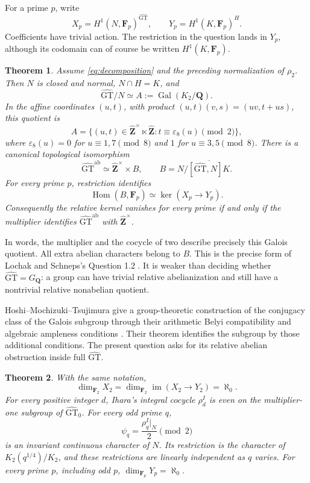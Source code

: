 \documentclass[11pt,a4paper]{article}
\newtheorem{theorem}{Theorem}[section]
\theoremstyle{definition}
\theoremstyle{remark}
\newcommand{\GT}{\widehat{\mathrm{GT}}}
\newcommand{\GTz}{\widehat{\mathrm{GT}}_0}
\newcommand{\Zh}{\widehat{\mathbf Z}}
\newcommand{\Q}{\mathbf Q}
\newcommand{\F}{\mathbf F}
\newcommand{\GQ}{G_{\Q}}
\newcommand{\ab}{\mathrm{ab}}
\DeclareMathOperator{\Hom}{Hom}
\DeclareMathOperator{\Gal}{Gal}
\begin{document}
For a prime $p$, write
\[
 X_p=H^1(N,\F_p)^{\GT},\qquad
 Y_p=H^1(K,\F_p)^H.
\]
Coefficients have trivial action. The restriction in the question lands in $Y_p$, although its codomain can of course be written $H^1(K,\F_p)$.

\begin{theorem}\label{thm:main-structural}
Assume \eqref{eq:decomposition} and the preceding normalization of $\rho_2$. Then $N$ is closed and normal, $N\cap H=K$, and
\[
 \GT/N\simeq A:=\Gal(K_2/\Q).
\]
In the affine coordinates $(u,t)$, with product
$(u,t)(v,s)=(uv,t+us)$, this quotient is
\[
 A=\{(u,t)\in\Zh^\times\ltimes\Zh:
 t\equiv\varepsilon_8(u)\pmod2\},
\]
where $\varepsilon_8(u)=0$ for $u\equiv1,7\pmod8$ and $1$ for $u\equiv3,5\pmod8$.
There is a canonical topological isomorphism
\[
 \GT^{\ab}\simeq\Zh^\times\times B,\qquad
 B=N/\overline{[\GT,N]K}.
\]
For every prime $p$, restriction identifies
\[
 \Hom(B,\F_p)\simeq\ker(X_p\longrightarrow Y_p).
\]
Consequently the relative kernel vanishes for every prime if and only if the multiplier identifies $\GT^{\ab}$ with $\Zh^\times$.
\end{theorem}

In words, the multiplier and the cocycle of two describe precisely this Galois quotient. All extra abelian characters belong to $B$. This is the precise form of Lochak and Schneps's Question 1.2 \cite[\S1, Question 1.2]{LS2006}. It is weaker than deciding whether $\GT=\GQ$: a group can have trivial relative abelianization and still have a nontrivial relative nonabelian quotient.

Hoshi--Mochizuki--Tsujimura give a group-theoretic construction of the
conjugacy class of the Galois subgroup through their arithmetic Belyi
compatibility and algebraic ampleness conditions
\cite[Theorem~C(ii), p.~5; Definition~5.12, pp.~87--90]{HMT2025}.
Their theorem identifies the subgroup by those additional conditions.
The present question asks for its relative abelian obstruction inside
full $\GT$.

\begin{theorem}\label{thm:main-dimension}
With the same notation,
\[
 \dim_{\F_2} X_2=\dim_{\F_2}\operatorname{im}(X_2\longrightarrow Y_2)=\aleph_0.
\]
For every positive integer $d$, Ihara's integral cocycle $\rho_d^I$ is even on the multiplier-one subgroup of $\GTz$. For every odd prime $q$,
\[
 \psi_q=\frac{\rho_q^I|_N}{2}\pmod2
\]
is an invariant continuous character of $N$. Its restriction is the character of $K_2(q^{1/4})/K_2$, and these restrictions are linearly independent as $q$ varies. For every prime $p$, including odd $p$, $\dim_{\F_p}Y_p=\aleph_0$.
\end{theorem}
\end{document}
